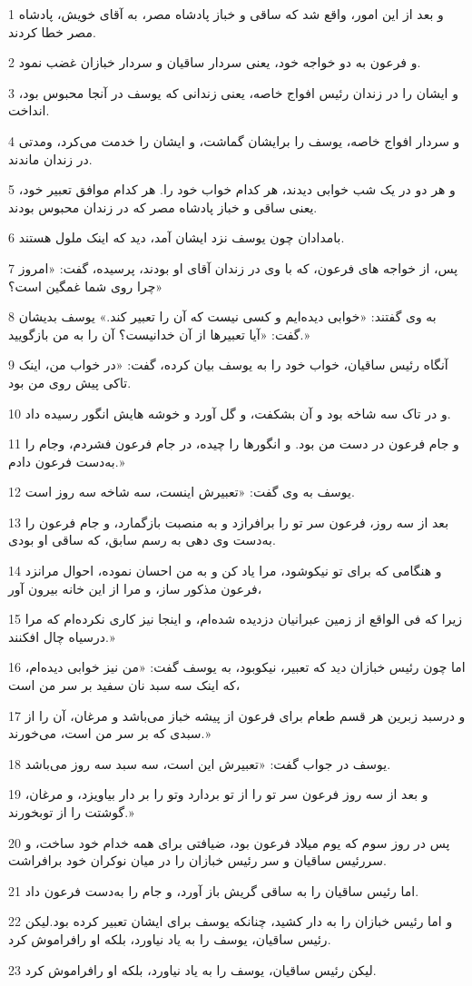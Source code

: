 \par 1 و بعد از این امور، واقع شد که ساقی و خباز پادشاه مصر، به آقای خویش، پادشاه مصر خطا کردند.
\par 2 و فرعون به دو خواجه خود، یعنی سردار ساقیان و سردار خبازان غضب نمود.
\par 3 و ایشان را در زندان رئیس افواج خاصه، یعنی زندانی که یوسف در آنجا محبوس بود، انداخت.
\par 4 و سردار افواج خاصه، یوسف را برایشان گماشت، و ایشان را خدمت می‌کرد، ومدتی در زندان ماندند.
\par 5 و هر دو در یک شب خوابی دیدند، هر کدام خواب خود را. هر کدام موافق تعبیر خود، یعنی ساقی و خباز پادشاه مصر که در زندان محبوس بودند.
\par 6 بامدادان چون یوسف نزد ایشان آمد، دید که اینک ملول هستند.
\par 7 پس، از خواجه های فرعون، که با وی در زندان آقای او بودند، پرسیده، گفت: «امروز چرا روی شما غمگین است؟»
\par 8 به وی گفتند: «خوابی دیده‌ایم و کسی نیست که آن را تعبیر کند.» یوسف بدیشان گفت: «آیا تعبیرها از آن خدانیست؟ آن را به من بازگویید.»
\par 9 آنگاه رئیس ساقیان، خواب خود را به یوسف بیان کرده، گفت: «در خواب من، اینک تاکی پیش روی من بود.
\par 10 و در تاک سه شاخه بود و آن بشکفت، و گل آورد و خوشه هایش انگور رسیده داد.
\par 11 و جام فرعون در دست من بود. و انگورها را چیده، در جام فرعون فشردم، وجام را به‌دست فرعون دادم.»
\par 12 یوسف به وی گفت: «تعبیرش اینست، سه شاخه سه روز است.
\par 13 بعد از سه روز، فرعون سر تو را برافرازد و به منصبت بازگمارد، و جام فرعون را به‌دست وی دهی به رسم سابق، که ساقی او بودی.
\par 14 و هنگامی که برای تو نیکوشود، مرا یاد کن و به من احسان نموده، احوال مرانزد فرعون مذکور ساز، و مرا از این خانه بیرون آور،
\par 15 زیرا که فی الواقع از زمین عبرانیان دزدیده شده‌ام، و اینجا نیز کاری نکرده‌ام که مرا درسیاه چال افکنند.»
\par 16 اما چون رئیس خبازان دید که تعبیر، نیکوبود، به یوسف گفت: «من نیز خوابی دیده‌ام، که اینک سه سبد نان سفید بر سر من است،
\par 17 و درسبد زبرین هر قسم طعام برای فرعون از پیشه خباز می‌باشد و مرغان، آن را از سبدی که بر سر من است، می‌خورند.»
\par 18 یوسف در جواب گفت: «تعبیرش این است، سه سبد سه روز می‌باشد.
\par 19 و بعد از سه روز فرعون سر تو را از تو بردارد وتو را بر دار بیاویزد، و مرغان، گوشتت را از توبخورند.»
\par 20 پس در روز سوم که یوم میلاد فرعون بود، ضیافتی برای همه خدام خود ساخت، و سررئیس ساقیان و سر رئیس خبازان را در میان نوکران خود برافراشت.
\par 21 اما رئیس ساقیان را به ساقی گریش باز آورد، و جام را به‌دست فرعون داد.
\par 22 و اما رئیس خبازان را به دار کشید، چنانکه یوسف برای ایشان تعبیر کرده بود.لیکن رئیس ساقیان، یوسف را به یاد نیاورد، بلکه او رافراموش کرد.
\par 23 لیکن رئیس ساقیان، یوسف را به یاد نیاورد، بلکه او رافراموش کرد.
 
